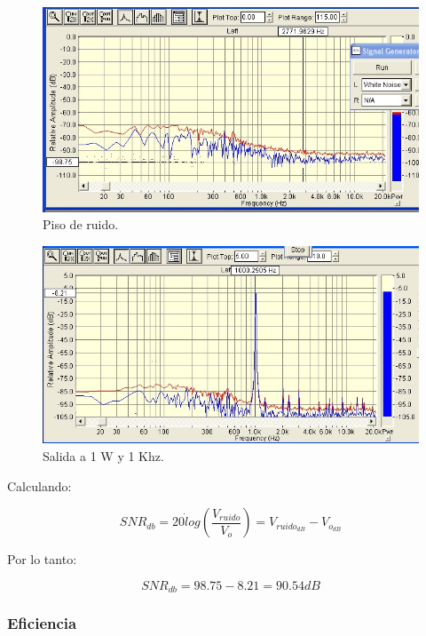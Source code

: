 			\begin{figure}[H]
				\centering
				\includegraphics[scale=0.6]{./Figuras/ruido_balnco.jpg}
			\caption{Piso de ruido.}
			\end{figure}

			\begin{figure}[H]
				\centering
				\includegraphics[scale=0.6]{./Figuras/SNR_1K_1W_imagen2.jpg}
			\caption{Salida a 1 W y 1 Khz.}
			\end{figure}


			Calculando:

			\begin{equation*}
			SNR_{db}  = 20 \dot log(\frac{V_{ruido}}{V_o}) = V_{ruido_{dB}} - V_{o_{dB}}
			\end{equation*}

			Por lo tanto: 

			\begin{equation*}
			SNR_{db}  = 98.75 - 8.21 = 90.54 dB  
			\end{equation*}

			\subsubsection{Eficiencia}

